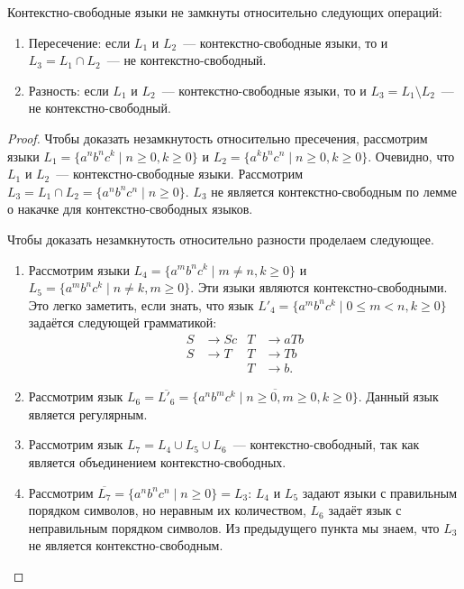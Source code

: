 \begin{theorem}
    Контекстно-свободные языки не замкнуты относительно следующих операций:
    \begin{enumerate}
        \item Пересечение: если $L_1$ и $L_2$~--- контекстно-свободные языки, то и $L_3 = L_1 \cap L_2$~--- не контекстно-свободный.
        \item Разность: если $L_1$ и $L_2$~--- контекстно-свободные языки, то и $L_3 = L_1 \setminus L_2$~--- не контекстно-свободный.
    \end{enumerate}
\end{theorem}

\begin{proof}
    Чтобы доказать незамкнутость относительно пресечения, рассмотрим языки $L_1 = \{a^n b^n c^k \mid n \geq 0, k \geq 0\}$ и $L_2 = \{a^k b^n c^n \mid n \geq 0, k \geq 0\}$.
    Очевидно, что $L_1$ и $L_2$~--- контекстно-свободные языки.
    Рассмотрим $L_3 = L_1 \cap L_2 = \{a^n b^n c^n \mid n \geq 0\}$.
    $L_3$ не является контекстно-свободным по лемме о накачке для контекстно-свободных языков.

    Чтобы доказать незамкнутость относительно разности проделаем следующее.
    \begin{enumerate}
        \item Рассмотрим языки $L_4 = \{a^m b^n c^k \mid m \neq n, k \geq 0\}$ и $L_5 = \{a^m b^n c^k \mid n \neq k, m \geq 0\}$.
              Эти языки являются контекстно-свободными.
              Это легко заметить, если знать, что язык $L'_4 = \{a^m b^n c^k \mid 0 \leq m < n, k \geq 0\}$ задаётся следующей грамматикой:
              \begin{align*}
                  S & \to S c & T & \to a T b \\
                  S & \to T   & T & \to T b   \\
                    &         & T & \to b.
              \end{align*}
        \item Рассмотрим язык $L_6 = \overline{L'_6} = \overline{\{a^n b^m c^k \mid n \geq 0, m \geq 0, k \geq 0\}}$.
              Данный язык является регулярным.
        \item Рассмотрим язык $L_7 = L_4 \cup L_5 \cup L_6$~--- контекстно-свободный, так как является объединением контекстно-свободных.
        \item Рассмотрим $\overline{L_7} = \{a^n b^n c^n \mid n \geq 0\} = L_3$: $L_4$ и $L_5$ задают языки с правильным порядком символов, но неравным их количеством, $L_6$ задаёт язык с неправильным порядком символов.
              Из предыдущего пункта мы знаем, что $L_3$  не является контекстно-свободным.
              \qedhere
    \end{enumerate}
\end{proof}

